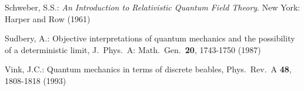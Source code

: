 \documentclass[12pt]{article}
\newcommand{\1}{\mathbf{1}} %
\begin{document}
\begin{thebibliography}{28.}
 Schweber, S.S.: \textit{An Introduction to
   Relativistic Quantum Field Theory}. New York: Harper and Row (1961)

 Sudbery, A.: Objective interpretations of quantum
   mechanics and the possibility of a deterministic limit, J.\ Phys.\
   A: Math.\ Gen.\ \textbf{20}, 1743-1750 (1987)


 Vink, J.C.: Quantum mechanics in terms of discrete
   beables, Phys.\ Rev.\ A \textbf{48}, 1808-1818 (1993)



\end{thebibliography}
\end{document}
